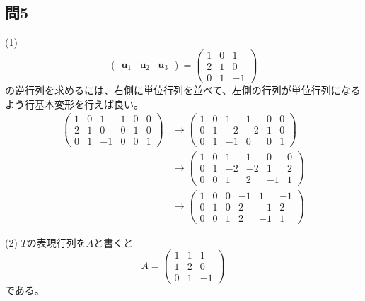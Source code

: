 \subsection{問5}
\noindent (1)
\[
\begin{pmatrix}
\bm{u}_1 & \bm{u}_2 & \bm{u}_3
\end{pmatrix}
=
\begin{pmatrix}
1 & 0 & 1 \\
2 & 1 & 0 \\
0 & 1 & -1
\end{pmatrix}
\]
の逆行列を求めるには、右側に単位行列を並べて、左側の行列が単位行列になるよう行基本変形を行えば良い。
\begin{align*}
\left(
\begin{array}{rrr|rrr}
1 & 0 & 1 & 1 & 0 & 0 \\
2 & 1 & 0 & 0 & 1 & 0 \\
0 & 1 & -1 & 0 & 0 & 1
\end{array}
\right)
&\rightarrow
\left(
\begin{array}{rrr|rrr}
1 & 0 & 1 & 1 & 0 & 0 \\
0 & 1 & -2 & -2 & 1 & 0 \\
0 & 1 & -1 & 0 & 0 & 1
\end{array}
\right) \\
&\rightarrow
\left(
\begin{array}{rrr|rrr}
1 & 0 & 1 & 1 & 0 & 0 \\
0 & 1 & -2 & -2 & 1 & 2 \\
0 & 0 & 1 & 2 & -1 & 1
\end{array}
\right) \\
&\rightarrow
\left(
\begin{array}{rrr|rrr}
1 & 0 & 0 & -1 & 1 & -1 \\
0 & 1 & 0 & 2 & -1 & 2 \\
0 & 0 & 1 & 2 & -1 & 1
\end{array} \right)
\end{align*}

\noindent (2) $T$の表現行列を$A$と書くと
\[
A =
\begin{pmatrix}
1 & 1 & 1 \\
1 & 2 & 0 \\
0 & 1 & -1
\end{pmatrix}
\]
である。

